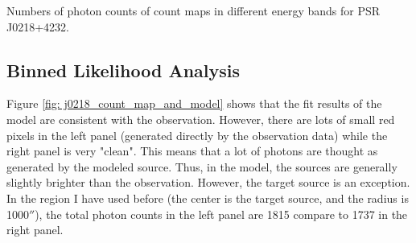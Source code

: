 \documentclass[12pt]{report}
\newcommand{\mycaption}[1]{\protect \caption{#1}}
\begin{document}
      \begin{table}[!htp]   
        \centering
        \mycaption{Numbers of photon counts of count maps in different energy bands for 
              PSR J0218+4232.}
        \label{table:j0218_ccube_photon_counts}
      \end{table}

    \subsection{Binned Likelihood Analysis}
      Figure \ref{fig: j0218_count_map_and_model} shows that the fit results of the model 
      are consistent with the observation. However, there are lots of small red pixels 
      in the left panel (generated directly by the observation data) while the 
      right panel is very "clean". This means that a lot of photons are thought as 
      generated by the modeled source. Thus, in the model, the sources are generally 
      slightly brighter than the observation. However, the target
      source is an exception. In the region I have used before (the center is the 
      target source, and the radius is 1000$''$), the total photon counts in the left 
      panel are 1815 compare to 1737 in the right panel. 
\end{document}
